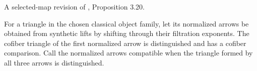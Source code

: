 \begin{definition}
\label{sem:Literature:normalized-cofiber}
A selected-map revision of \cite{LWX126}, Proposition 3.20.\par

For a triangle in the chosen classical object family, let its normalized arrows be obtained from synthetic lifts by shifting through their filtration exponents. The cofiber triangle of the first normalized arrow is distinguished and has a cofiber comparison. Call the normalized arrows compatible when the triangle formed by all three arrows is distinguished.
\end{definition}

